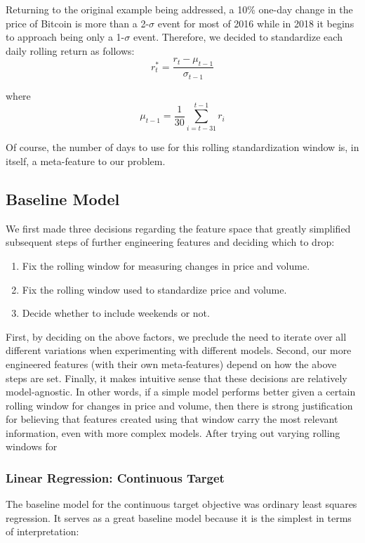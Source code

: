 \documentclass[12pt,twoside]{article}
\begin{document}
Returning to the original example being addressed, a 10\% one-day change in the price of Bitcoin is more than a 2-$\sigma$ event for most of 2016 while in 2018 it begins to approach being only a 1-$\sigma$ event. Therefore, we decided to standardize each daily rolling return as follows:
$$r^*_t = \frac{r_t - \mu_{t-1}}{\sigma_{t-1}}$$

where 
$$\mu_{t-1}=\frac{1}{30} \sum_{i=t-31}^{t-1} r_i$$

Of course, the number of days to use for this rolling standardization window is, in itself, a meta-feature to our problem.

\subsection{Baseline Model}

We first made three decisions regarding the feature space that greatly simplified subsequent steps of further engineering features and deciding which to drop:
\begin{enumerate}
	\item Fix the rolling window for measuring changes in price and volume.
	\item Fix the rolling window used to standardize price and volume.
	\item Decide whether to include weekends or not.
\end{enumerate}

First, by deciding on the above factors, we preclude the need to iterate over all different variations when experimenting with different models. Second, our more engineered features (with their own meta-features) depend on how the above steps are set. Finally, it makes intuitive sense that these decisions are relatively model-agnostic. In other words, if a simple model performs better given a certain rolling window for changes in price and volume, then there is strong justification for believing that features created using that window carry the most relevant information, even with more complex models.
\bigbreak
After trying out varying rolling windows for 
\subsubsection{Linear Regression: Continuous Target}

The baseline model for the continuous target objective was ordinary least squares regression. It serves as a great baseline model because it is the simplest in terms of interpretation: 
\end{document}
